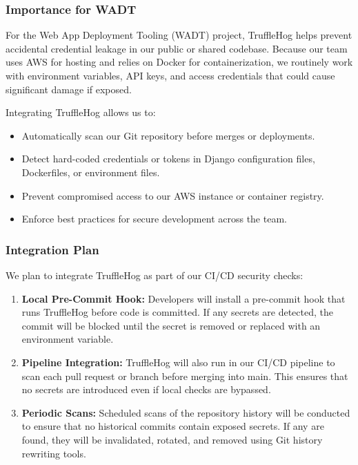 \documentclass[12pt]{article}
\begin{document}
\subsubsection{Importance for WADT}
For the Web App Deployment Tooling (WADT) project, TruffleHog helps prevent accidental credential leakage in our public or shared codebase. Because our team uses AWS for hosting and relies on Docker for containerization, we routinely work with environment variables, API keys, and access credentials that could cause significant damage if exposed.

Integrating TruffleHog allows us to:
\begin{itemize}
    \item Automatically scan our Git repository before merges or deployments.
    \item Detect hard-coded credentials or tokens in Django configuration files, Dockerfiles, or environment files.
    \item Prevent compromised access to our AWS instance or container registry.
    \item Enforce best practices for secure development across the team.
\end{itemize}

\subsubsection{Integration Plan}
We plan to integrate TruffleHog as part of our CI/CD security checks:
\begin{enumerate}
    \item \textbf{Local Pre-Commit Hook:} Developers will install a pre-commit hook that runs TruffleHog before code is committed. If any secrets are detected, the commit will be blocked until the secret is removed or replaced with an environment variable.
    \item \textbf{Pipeline Integration:} TruffleHog will also run in our CI/CD pipeline to scan each pull request or branch before merging into main. This ensures that no secrets are introduced even if local checks are bypassed.
    \item \textbf{Periodic Scans:} Scheduled scans of the repository history will be conducted to ensure that no historical commits contain exposed secrets. If any are found, they will be invalidated, rotated, and removed using Git history rewriting tools.
\end{enumerate}
\end{document}
